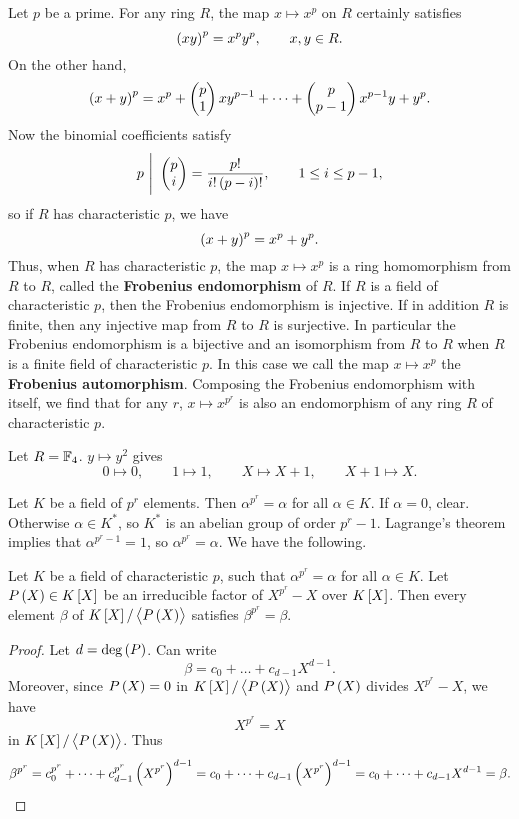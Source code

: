 Let $ p $ be a prime. For any ring $ R $, the map $ x \mapsto x^p $ on $ R $ certainly satisfies
$$ \br{xy}^p = x^py^p, \qquad x, y \in R. $$
On the other hand,
$$ \br{x + y}^p = x^p + \twobyone{p}{1}xy^{p - 1} + \dots + \twobyone{p}{p - 1}x^{p - 1}y + y^p. $$
Now the binomial coefficients satisfy
$$ p \ \Bigg| \ \twobyone{p}{i} = \dfrac{p!}{i!\br{p - i}!}, \qquad 1 \le i \le p - 1, $$
so if $ R $ has characteristic $ p $, we have
$$ \br{x + y}^p = x^p + y^p. $$
Thus, when $ R $ has characteristic $ p $, the map $ x \mapsto x^p $ is a ring homomorphism from $ R $ to $ R $, called the \textbf{Frobenius endomorphism} of $ R $. If $ R $ is a field of characteristic $ p $, then the Frobenius endomorphism is injective. If in addition $ R $ is finite, then any injective map from $ R $ to $ R $ is surjective. In particular the Frobenius endomorphism is a bijective and an isomorphism from $ R $ to $ R $ when $ R $ is a finite field of characteristic $ p $. In this case we call the map $ x \mapsto x^p $ the \textbf{Frobenius automorphism}. Composing the Frobenius endomorphism with itself, we find that for any $ r $, $ x \mapsto x^{p^r} $ is also an endomorphism of any ring $ R $ of characteristic $ p $.

\begin{example*}
Let $ R = \mathbb{F}_4 $. $ y \mapsto y^2 $ gives
$$ 0 \mapsto 0, \qquad 1 \mapsto 1, \qquad X \mapsto X + 1, \qquad X + 1 \mapsto X. $$
\end{example*}

Let $ K $ be a field of $ p^r $ elements. Then $ \alpha^{p^r} = \alpha $ for all $ \alpha \in K $. If $ \alpha = 0 $, clear. Otherwise $ \alpha \in K^* $, so $ K^* $ is an abelian group of order $ p^r - 1 $. Lagrange's theorem implies that $ \alpha^{p^r - 1} = 1 $, so $ \alpha^{p^r} = \alpha $. We have the following.

\begin{proposition}
Let $ K $ be a field of characteristic $ p $, such that $ \alpha^{p^r} = \alpha $ for all $ \alpha \in K $. Let $ P\br{X} \in K\sbr{X} $ be an irreducible factor of $ X^{p^r} - X $ over $ K\sbr{X} $. Then every element $ \beta $ of $ K\sbr{X} / \abr{P\br{X}} $ satisfies $ \beta^{p^r} = \beta $.
\end{proposition}

\begin{proof}
Let $ d = \deg\br{P} $. Can write
$$ \beta = c_0 + \dots + c_{d - 1}X^{d - 1}. $$
Moreover, since $ P\br{X} = 0 $ in $ K\sbr{X} / \abr{P\br{X}} $ and $ P\br{X} $ divides $ X^{p^r} - X $, we have
$$ X^{p^r} = X $$
in $ K\sbr{X} / \abr{P\br{X}} $. Thus
$$ \beta^{p^r} = c_0^{p^r} + \dots + c_{d - 1}^{p^r}\br{X^{p^r}}^{d - 1} = c_0 + \dots + c_{d - 1}\br{X^{p^r}}^{d - 1} = c_0 + \dots + c_{d - 1}X^{d - 1} = \beta. $$
\end{proof}

